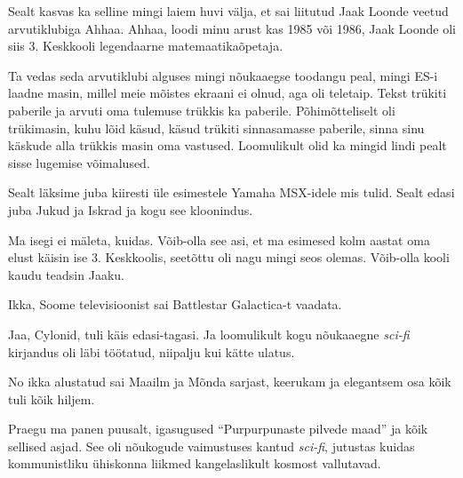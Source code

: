 Sealt kasvas ka selline mingi laiem huvi välja, et sai liitutud  Jaak 
Loonde veetud arvutiklubiga 
Ahhaa. Ahhaa, loodi minu arust kas 1985 või 1986, Jaak 
Loonde oli siis 3. Keskkooli legendaarne 
matemaatikaõpetaja. 

Ta vedas seda arvutiklubi alguses mingi nõukaaegse toodangu peal, mingi 
ES-i laadne masin, millel meie mõistes ekraani ei olnud, aga oli teletaip. 
Tekst trükiti paberile ja arvuti oma tulemuse trükkis ka paberile. 
Põhimõtteliselt oli trükimasin, kuhu lõid käsud, käsud trükiti sinnasamasse 
paberile, sinna sinu käskude alla trükkis masin oma vastused. Loomulikult olid ka
 mingid lindi pealt sisse lugemise võimalused.

Sealt läksime juba kiiresti üle esimestele Yamaha 
MSX-idele mis tulid. Sealt edasi juba Jukud ja 
Iskrad ja kogu see kloonindus.


Ma isegi ei mäleta, kuidas. Võib-olla see asi, et ma esimesed kolm aastat oma 
elust käisin ise 3. Keskkoolis, seetõttu oli nagu mingi seos olemas. Võib-olla 
kooli kaudu teadsin Jaaku. 
                 

Ikka, Soome televisioonist sai Battlestar Galactica-t vaadata.


Jaa, Cylonid, tuli käis edasi-tagasi. Ja loomulikult kogu nõukaaegne 
\emph{sci-fi} kirjandus oli läbi töötatud, niipalju kui kätte ulatus.
      

No ikka alustatud sai Maailm ja Mõnda sarjast, keerukam ja elegantsem osa kõik tuli kõik hiljem. 

Praegu ma panen puusalt, igasugused \enquote{Purpurpunaste pilvede 
maad} ja kõik sellised asjad. See oli nõukogude vaimustuses 
kantud \emph{sci-fi}, jutustas kuidas kommunistliku ühiskonna liikmed 
kangelaslikult kosmost vallutavad.

